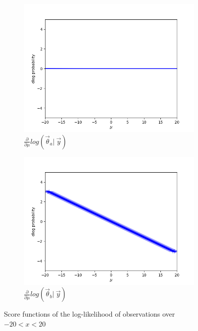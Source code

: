 \begin{figure}[H]
    \centering
    \begin{subfigure}{0.475\textwidth}
        \includegraphics[width=\textwidth]{figs/background/deriv_var_10.png}
        \caption[]{$\frac{\partial}{\partial\mu} log(\vec{\theta}_a |\ \vec{y})$}
    \end{subfigure}
    \begin{subfigure}{0.475\textwidth}
        \includegraphics[width=\textwidth]{figs/background/deriv_var_0.5.png}
        \caption[]{$\frac{\partial}{\partial\mu} log(\vec{\theta}_b |\ \vec{y})$}
    \end{subfigure}
    \caption{Score functions of the log-likelihood of observations over $-20<x<20$}
    \label{fig:scorefunctions}
\end{figure}

